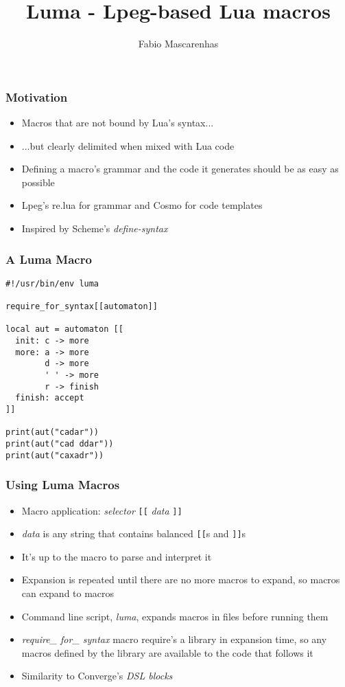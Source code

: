 \documentclass{beamer}
\title{Luma - Lpeg-based Lua macros}
\author{Fabio Mascarenhas}
\begin{document}
\begin{frame}
\titlepage
\end{frame}

\begin{frame}
\frametitle{Motivation}

\begin{itemize}
\item Macros that are not bound by Lua's syntax...
\item ...but clearly delimited when mixed with Lua code
\item Defining a macro's grammar and the code it generates
should be as easy as possible
\item Lpeg's re.lua for grammar and Cosmo for code templates
\item Inspired by Scheme's \emph{define-syntax}
\end{itemize}

\end{frame}

\begin{frame}[fragile]
\frametitle{A Luma Macro}

\begin{verbatim}
#!/usr/bin/env luma

require_for_syntax[[automaton]]

local aut = automaton [[
  init: c -> more
  more: a -> more
        d -> more
        ' ' -> more
        r -> finish
  finish: accept
]]

print(aut("cadar"))
print(aut("cad ddar"))
print(aut("caxadr"))

\end{verbatim}

\end{frame}

\begin{frame}[fragile]
\frametitle{Using Luma Macros}

\begin{itemize}
\item Macro application: \emph{selector} \verb|[[| \emph{data} \verb|]]|
\item \emph{data} is any string that contains balanced \verb|[[|s and \verb|]]|s
\item It's up to the macro to parse and interpret it
\item Expansion is repeated until there are no more macros to expand, so
macros can expand to macros
\item Command line script, \emph{luma}, expands macros in files before running them
\item \emph{require\_ for\_ syntax} macro require's a library in expansion time, so any
macros defined by the library are available to the code that follows it
\item Similarity to Converge's \emph{DSL blocks}
\end{itemize}

\end{frame}
\end{document}
